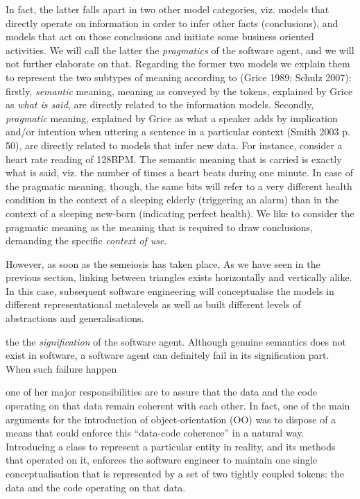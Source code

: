 \documentclass[a4paper,11pt,oneside,oldfontcommands]{memoir}
\theoremstyle{definition}
\theoremstyle{break}		%
\numberwithin{equation}{chapter}
\numberwithin{figure}{chapter}
\begin{document}
In fact, the latter falls apart in two other model categories, viz.
models that directly operate on information in order to infer other
facts (conclusions), and models that act on those conclusions and
initiate some business oriented activities. We will call the latter the
\emph{pragmatics} of the software agent, and we will not further
elaborate on that. Regarding the former two models we explain them to
represent the two subtypes of meaning according to (Grice 1989; Schulz
2007): firstly, \emph{semantic} meaning, meaning as conveyed by the
tokens, explained by Grice as \emph{what is said}, are directly related
to the information models. Secondly, \emph{pragmatic} meaning, explained
by Grice as what a speaker adds by implication and/or intention when
uttering a sentence in a particular context (Smith 2003 p. 50), are
directly related to models that infer new data. For instance, consider a
heart rate reading of 128BPM. The semantic meaning that is carried is
exactly what is said, viz. the number of times a heart beats during one
minute. In case of the pragmatic meaning, though, the same bits will
refer to a very different health condition in the context of a sleeping
elderly (triggering an alarm) than in the context of a sleeping new-born
(indicating perfect health). We like to consider the pragmatic meaning
as the meaning that is required to draw conclusions, demanding the
specific \emph{context of use}.

However, as soon as the semeiosis has taken place, As we have seen in
the previous section, linking between triangles exists horizontally and
vertically alike. In this case, subsequent software engineering will
conceptualise the models in different representational metalevels as
well as built different levels of abstractions and generalisations.

the the \emph{signification} of the software agent. Although genuine
semantics does not exist in software, a software agent can definitely
fail in its signification part. When such failure happen

one of her major responsibilities are to assure that the data and the
code operating on that data remain coherent with each other. In fact,
one of the main arguments for the introduction of object-orientation
(OO) was to dispose of a means that could enforce this ``data-code
coherence'' in a natural way. Introducing a class to represent a
particular entity in reality, and its methods that operated on it,
enforces the software engineer to maintain one single conceptualisation
that is represented by a set of two tightly coupled tokens: the data and
the code operating on that data.
\end{document}
